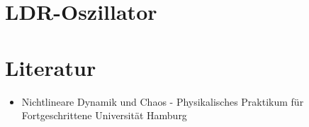 \documentclass{scrartcl}
\begin{document}
\section {LDR-Oszillator}


\section{ Literatur }
\begin{itemize} 
\item Nichtlineare Dynamik und Chaos - Physikalisches Praktikum für Fortgeschrittene Universität Hamburg
\end{itemize}
\end{document}
